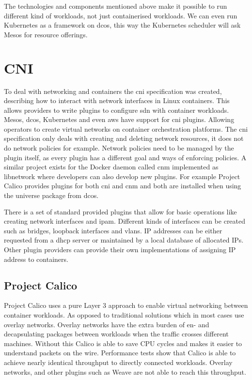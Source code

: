 The technologies and components mentioned above make it possible to run different kind of workloads, not just containerised workloads. We can even run Kubernetes as a framework on \gls{dcos}, this way the Kubernetes scheduler will ask Mesos for resource offerings.

\section{CNI}
\label{sec:cni}
To deal with networking and containers the \gls{cni} specification was created, describing how to interact with network interfaces in Linux containers. This allows providers to write plugins to configure \gls{sdn} with container workloads. Mesos, \gls{dcos}, Kubernetes and even \gls{aws} have support for \gls{cni} plugins. Allowing operators to create virtual networks on container orchestration platforms.
The \gls{cni} specification only deals with creating and deleting network resources, it does not do network policies for example. Network policies need to be managed by the plugin itself, as every plugin has a different goal and ways of enforcing policies. A similar project exists for the Docker daemon called \gls{cnm}\cite{cnm, dua2016learning} implemented as libnetwork where developers can also develop new plugins. For example Project Calico provides plugins for both \gls{cni} and \gls{cnm} and both are installed when using the universe package from \gls{dcos}.

There is a set of standard provided plugins\cite{cni_plugin} that allow for basic operations like creating network interfaces and \gls{ipam}. Different kinds of interfaces can be created such as bridges, loopback interfaces and \glspl{vlan}. IP addresses can be either requested from a \gls{dhcp} server or maintained by a local database of allocated IPs. Other plugin providers can provide their own implementations of assigning IP address to containers.

\subsection{Project Calico}
\label{subsec:calico}
Project Calico uses a pure Layer 3 approach to enable virtual networking between container workloads. As opposed to traditional solutions which in most cases use overlay networks. Overlay networks have the extra burden of en- and decapsulating packages between workloads when the traffic crosses different machines. Without this Calico is able to save CPU cycles and makes it easier to understand packets on the wire. Performance tests\cite{dzone, dataplane, chunqi} show that Calico is able to achieve nearly identical throughput to directly connected workloads. Overlay networks, and other plugins such as Weave\cite{weave} are not able to reach this throughput.

